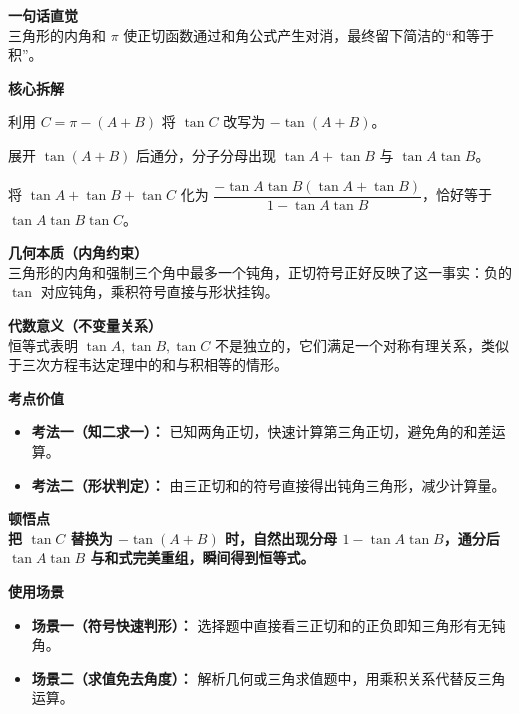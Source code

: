 \begin{explanationbox}
\textbf{\textcolor{CExplanation}{一句话直觉}}
\\
三角形的内角和 $\pi$ 使正切函数通过和角公式产生对消，最终留下简洁的“和等于积”。

\medskip
\textbf{\textcolor{CExplanation}{核心拆解}}
\begin{description}[style=nextline, leftmargin=2.8em, labelsep=0.5em, itemsep=0.45em]
    \item[\textbf{要点一（内角代换）：}] 利用 $C = \pi - (A+B)$ 将 $\tan C$ 改写为 $-\tan(A+B)$。
    \item[\textbf{要点二（和角展开）：}] 展开 $\tan(A+B)$ 后通分，分子分母出现 $\tan A + \tan B$ 与 $\tan A \tan B$。
    \item[\textbf{要点三（乘积匹配）：}] 将 $\tan A + \tan B + \tan C$ 化为 $\dfrac{-\tan A \tan B (\tan A + \tan B)}{1 - \tan A \tan B}$，恰好等于 $\tan A \tan B \tan C$。
\end{description}

\medskip
\textbf{\textcolor{CExplanation}{几何本质（内角约束）}}
\\
三角形的内角和强制三个角中最多一个钝角，正切符号正好反映了这一事实：负的 $\tan$ 对应钝角，乘积符号直接与形状挂钩。

\medskip
\textbf{\textcolor{CExplanation}{代数意义（不变量关系）}}
\\
恒等式表明 $\tan A, \tan B, \tan C$ 不是独立的，它们满足一个对称有理关系，类似于三次方程韦达定理中的和与积相等的情形。

\medskip
\textbf{\textcolor{CExplanation}{考点价值}}
\begin{itemize}[leftmargin=*, itemsep=0.5em, topsep=0.4em]
    \item \textbf{考法一（知二求一）：} 已知两角正切，快速计算第三角正切，避免角的和差运算。
    \item \textbf{考法二（形状判定）：} 由三正切和的符号直接得出钝角三角形，减少计算量。
\end{itemize}

\medskip
\textbf{\textcolor{CExplanation}{顿悟点}}
\\
\textbf{把 $\tan C$ 替换为 $-\tan(A+B)$ 时，自然出现分母 $1-\tan A \tan B$，通分后 $\tan A \tan B$ 与和式完美重组，瞬间得到恒等式。}

\medskip
\textbf{\textcolor{CExplanation}{使用场景}}
\begin{itemize}[leftmargin=*, itemsep=0.5em, topsep=0.4em]
    \item \textbf{场景一（符号快速判形）：} 选择题中直接看三正切和的正负即知三角形有无钝角。
    \item \textbf{场景二（求值免去角度）：} 解析几何或三角求值题中，用乘积关系代替反三角运算。
\end{itemize}
\end{explanationbox}
